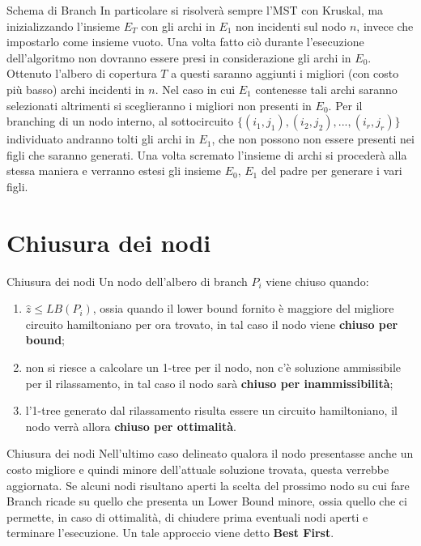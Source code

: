 \documentclass[10pt]{beamer}
\begin{document}
\begin{frame}{Schema di Branch}
    In particolare si risolverà sempre l'MST con Kruskal, ma inizializzando l'insieme $E_T$ con gli archi in $E_1$ non incidenti sul nodo $n$, invece che impostarlo come insieme vuoto. Una volta fatto ciò durante l'esecuzione dell'algoritmo non dovranno essere presi in considerazione gli archi in $E_0$. Ottenuto l'albero di copertura $T$ a questi saranno aggiunti i migliori (con costo più basso) archi incidenti in $n$. Nel caso in cui $E_1$ contenesse tali archi saranno selezionati altrimenti si sceglieranno i migliori non presenti in $E_0$. 
    \newline
    Per il branching di un nodo interno, al sottocircuito $\{(i_1, j_1), (i_2,j_2),...,(i_r,j_r)\}$ individuato andranno tolti gli archi in $E_1$, che non possono non essere presenti nei figli che saranno generati. Una volta scremato l'insieme di archi si procederà alla stessa maniera e verranno estesi gli insieme $E_0$, $E_1$ del padre per generare i vari figli.
\end{frame}

\section{Chiusura dei nodi}
\begin{frame}{Chiusura dei nodi}
    Un nodo dell'albero di branch $P_i$ viene chiuso quando:
    \begin{enumerate}
        \item $\hat{z} \leq LB(P_i)$, ossia quando il lower bound fornito è maggiore del migliore circuito hamiltoniano per ora trovato, in tal caso il nodo viene \textbf{chiuso per bound};
        \item non si riesce a calcolare un 1-tree per il nodo, non c'è soluzione ammissibile per il rilassamento, in tal caso il nodo sarà \textbf{chiuso per inammissibilità};
        \item l'1-tree generato dal rilassamento risulta essere un circuito hamiltoniano, il nodo verrà allora \textbf{chiuso per ottimalità}.
    \end{enumerate}
    
\end{frame}

\begin{frame}{Chiusura dei nodi}
    Nell'ultimo caso delineato qualora il nodo presentasse anche un costo migliore e quindi minore dell'attuale soluzione trovata, questa verrebbe aggiornata.
    \newline
    \newline
    Se alcuni nodi risultano aperti la scelta del prossimo nodo su cui fare Branch ricade su quello che presenta un Lower Bound minore, ossia quello che ci permette, in caso di ottimalità, di chiudere prima eventuali nodi aperti e terminare l'esecuzione. Un tale approccio viene detto \textbf{Best First}.
\end{frame}
\end{document}
